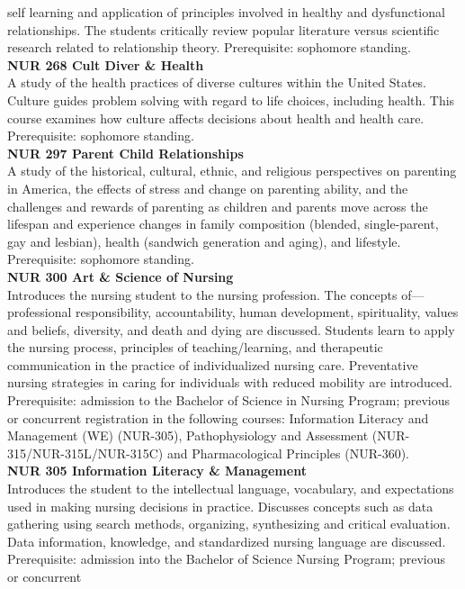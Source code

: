 \documentclass[
  letterpaper,
]{scrbook}
\begin{document}
self learning and application of principles involved in healthy and
dysfunctional relationships. The students critically review popular
literature versus scientific research related to relationship theory.
Prerequisite: sophomore standing.\\
\textbf{NUR 268 Cult Diver \& Health}\\
A study of the health practices of diverse cultures within the United
States. Culture guides problem solving with regard to life choices,
including health. This course examines how culture affects decisions
about health and health care. Prerequisite: sophomore standing.\\
\textbf{NUR 297 Parent Child Relationships}\\
A study of the historical, cultural, ethnic, and religious perspectives
on parenting in America, the effects of stress and change on parenting
ability, and the challenges and rewards of parenting as children and
parents move across the lifespan and experience changes in family
composition (blended, single-parent, gay and lesbian), health (sandwich
generation and aging), and lifestyle. Prerequisite: sophomore
standing.\\
\textbf{NUR 300 Art \& Science of Nursing}\\
Introduces the nursing student to the nursing profession. The concepts
of---professional responsibility, accountability, human development,
spirituality, values and beliefs, diversity, and death and dying are
discussed. Students learn to apply the nursing process, principles of
teaching/learning, and therapeutic communication in the practice of
individualized nursing care. Preventative nursing strategies in caring
for individuals with reduced mobility are introduced. Prerequisite:
admission to the Bachelor of Science in Nursing Program; previous or
concurrent registration in the following courses: Information Literacy
and Management (WE) (NUR-305), Pathophysiology and Assessment
(NUR-315/NUR-315L/NUR-315C) and Pharmacological Principles (NUR-360).\\
\textbf{NUR 305 Information Literacy \& Management}\\
Introduces the student to the intellectual language, vocabulary, and
expectations used in making nursing decisions in practice. Discusses
concepts such as data gathering using search methods, organizing,
synthesizing and critical evaluation. Data information, knowledge, and
standardized nursing language are discussed. Prerequisite: admission
into the Bachelor of Science Nursing Program; previous or concurrent
\end{document}
